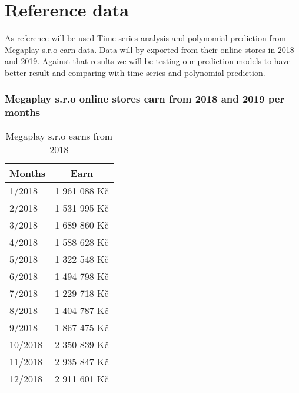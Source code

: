 
\chapter{Reference data}

As reference will be used Time series analysis and polynomial prediction from Megaplay s.r.o earn data. Data will by exported from their online stores in 2018 and 2019.
Against that results we will be testing our prediction models to have better result and comparing with time series and polynomial prediction.
\subsection{Megaplay s.r.o online stores earn from 2018 and 2019 per months}
\begin{table}[h!]
    \begin{center}
        \begin{tabular}{ | l | c | }
            \hline
            {\textbf{Months}} & \textbf{Earn} \\
            \hline
            1/2018 & 1 961 088 Kč \\
            \hline
            2/2018 & 1 531 995 Kč \\
            \hline
            3/2018 & 1 689 860 Kč \\
            \hline
            4/2018 & 1 588 628 Kč \\
            \hline
            5/2018 & 1 322 548 Kč \\
            \hline
            6/2018 & 1 494 798 Kč \\
            \hline
            7/2018 & 1 229 718 Kč \\
            \hline
            8/2018 & 1 404 787 Kč \\
            \hline
            9/2018 & 1 867 475 Kč \\
            \hline
            10/2018 & 2 350 839 Kč \\
            \hline
            11/2018 & 2 935 847 Kč \\
            \hline
            12/2018 & 2 911 601 Kč \\
            \hline
        \end{tabular}
    \end{center}
    \caption{Megaplay s.r.o earns from 2018}
    \label{Megaplay s.r.o earns from 2018}
\end{table}
\newpage
